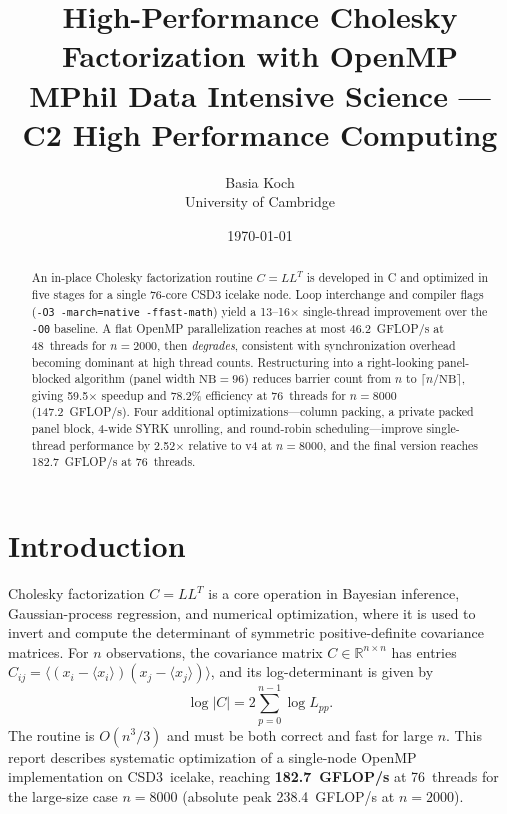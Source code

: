 \documentclass{article}
\title{High-Performance Cholesky Factorization with OpenMP\\
       \large MPhil Data Intensive Science --- C2 High Performance Computing}
\author{Basia Koch \\ University of Cambridge}
\date{\today}
\begin{document}
\maketitle

\begin{abstract}
An in-place Cholesky factorization routine $C = LL^T$ is developed in C and
optimized in five stages for a single 76-core CSD3 icelake node.
Loop interchange and compiler flags (\texttt{-O3 -march=native -ffast-math})
yield a 13--16$\times$ single-thread improvement over the \texttt{-O0} baseline.
A flat OpenMP parallelization reaches at most 46.2~GFLOP/s at 48~threads for
$n=2000$, then \emph{degrades}, consistent with synchronization overhead
becoming dominant at high thread counts.
Restructuring into a right-looking panel-blocked algorithm (panel width
$\mathrm{NB}=96$) reduces barrier count from $n$ to $\lceil n/\mathrm{NB}\rceil$,
giving 59.5$\times$ speedup and 78.2\% efficiency at 76~threads for $n=8000$
(147.2~GFLOP/s).
Four additional optimizations---column packing, a private packed panel block,
4-wide SYRK unrolling, and round-robin scheduling---improve single-thread
performance by 2.52$\times$ relative to v4 at $n{=}8000$, and the final
version reaches 182.7~GFLOP/s at 76~threads.
\end{abstract}

\section{Introduction}

Cholesky factorization $C = LL^T$ is a core operation in Bayesian inference,
Gaussian-process regression, and numerical optimization, where it is used to
invert and compute the determinant of symmetric positive-definite covariance
matrices.
For $n$ observations, the covariance matrix $C \in \mathbb{R}^{n \times n}$
has entries $C_{ij} = \langle(x_i - \langle x_i\rangle)(x_j - \langle x_j\rangle)\rangle$,
and its log-determinant is given by
\begin{equation}
  \log|C| = 2\sum_{p=0}^{n-1}\log L_{pp}.
  \label{eq:logdet}
\end{equation}
The routine is $O(n^3/3)$ and must be both correct and fast for large $n$.
This report describes systematic optimization of a single-node OpenMP
implementation on CSD3~icelake, reaching \textbf{182.7~GFLOP/s} at 76~threads
for the large-size case $n=8000$ (absolute peak 238.4~GFLOP/s at $n=2000$).
\end{document}
